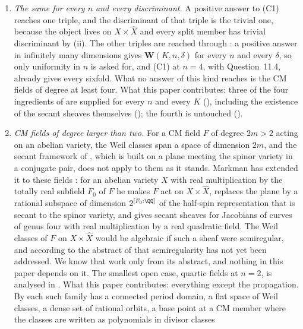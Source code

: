 \begin{enumerate}[label=\textup{(C\arabic*)},leftmargin=3.0em,itemsep=4pt]
  ().  states the two remaining questions in
  the form a construction would have to answer.
\item \emph{The same for every $n$ and every discriminant.} A positive answer
  to (C1) reaches one triple, and the discriminant of that triple is the
  trivial one, because the object lives on $X\times\widehat X$ and every split
  member has trivial discriminant by (ii). The other
  triples are reached through : a positive answer in
  infinitely many dimensions gives $\mathbf{W}(K,n,\delta)$ for every $n$ and
  every $\delta$, so only uniformity in $n$ is asked for, and (C1) at $n=4$,
  with Question~11.4, already gives every sixfold. What no answer of this kind reaches is
  the CM fields of degree at least four.
  What this paper contributes: three of the four
  ingredients of  are supplied for every $n$ and every $K$
  (), including the existence of the secant sheaves
  themselves (); the fourth is untouched
  ().
\item \emph{CM fields of degree larger than two.} For a CM field $F$ of
  degree $2m>2$ acting on an abelian variety, the Weil classes span a space of
  dimension $2m$, and the secant framework of , which
  is built on a plane meeting the spinor variety in a conjugate pair, does not
  apply to them as it stands. Markman has extended it to these fields
  \cite{Mar25c}: for an abelian variety $X$ with real multiplication by the
  totally real subfield $F_{0}$ of $F$ he makes $F$ act on
  $X\times\widehat{X}$, replaces the plane by a rational subspace of dimension
  $2^{[F_{0}:\QQ]}$ of the half-spin representation that is secant to the
  spinor variety, and gives secant sheaves for Jacobians of curves of genus
  four with real multiplication by a real quadratic field. The Weil classes
  of $F$ on $X\times\widehat{X}$ would be algebraic if such a sheaf were
  semiregular, and according to the abstract of \cite{Mar25c} that
  semiregularity has not yet been addressed. We know that work only from its
  abstract, and nothing in this paper depends on it. The smallest open case,
  quartic fields at $n=2$, is analysed in . What this paper
  contributes: everything except the propagation. By
   each such family has a connected period domain, a flat
  space of Weil classes, a dense set of rational orbits, a base point at a CM
  member where the classes are written as polynomials in divisor classes

\end{enumerate}
